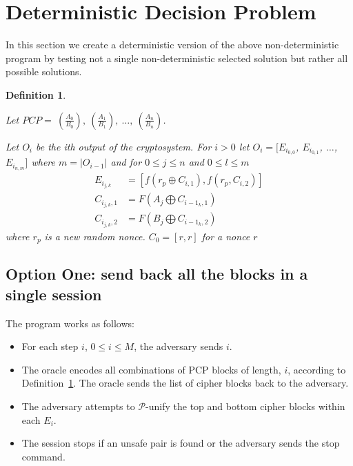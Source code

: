 \documentclass[11pt,twoside,a4paper]{article}
\newtheorem{definition}{Definition}
\begin{document}
\section{Deterministic Decision Problem}
In this section we create a deterministic version of the 
above non-deterministic program by testing not a single 
non-deterministic selected solution but rather all possible
solutions. 

\begin{definition}\label{det-func}
	
	Let $PCP = ~(\frac{A_0}{B_0}), ~(\frac{A_1}{B_1}), ~\ldots, ~(\frac{A_n}{B_n})$. 	
	
	Let $O_i$ be the ith output of the cryptosystem. 
	For $i > 0$ let $O_i = [E_{i_{0,0}}$, $E_{i_{0,1}}$, $\ldots$,
	$E_{i_{n,m}}]$ where $m = |O_{i-1}|$ and for 
	$0 \leq j \leq n$ and $0 \leq l \leq m$
	\begin{align*}
	E_{i_{j,k}} &= [f(r_p \oplus C_{i, 1}), f(r_p, C_{i,2}) ] \\
	C_{i_{j,k},1} &= F(A_j \bigoplus C_{i-1_{k}, 1})	\\
	C_{i_{j,k},2} &= F(B_j \bigoplus C_{i-1_{k}, 2}) 
	\end{align*}
	where $r_p$ is a new random nonce.
	$C_0 = [r,r]$ for a nonce $r$
\end{definition}

\subsection{Option One: send back all the blocks in a single session} 
The program works as follows:
\begin{itemize}
	\item For each step $i$, $0 \leq i \leq M$, the adversary
	sends $i$.
	\item The oracle encodes all combinations of PCP blocks
	of length, $i$, according to Definition~\ref{det-func}.
	The oracle sends the list of cipher blocks back to
	the adversary.
	\item The adversary attempts to $\mathcal{P}$-unify 
	the top and bottom cipher blocks within each $E_i$.
	\item The session stops if an unsafe pair is found or 
	the adversary sends the stop command. 
\end{itemize}
\end{document}
